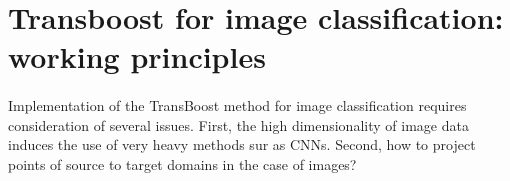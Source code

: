 \documentclass[11 pt]{article}
\begin{document}
\section{Transboost for image classification: working principles}

\paragraph{} Implementation of the TransBoost method for image classification requires consideration of several issues. First, the high dimensionality of image data induces the use of very heavy methods sur as CNNs. Second, how to project points of source to target domains in the case of images? 


\end{document}
